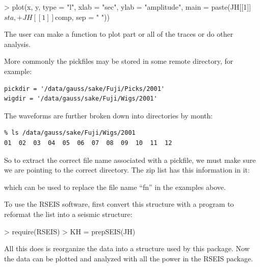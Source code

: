 \documentclass{article}
\begin{document}
\begin{Schunk}
\begin{Sinput}
> plot(x, y, type = "l", xlab = "sec", ylab = "amplitude", main = paste(JH[[1]]$sta, 
+     JH[[1]]$comp, sep = " "))
\end{Sinput}
\end{Schunk}

The user can make a function to plot part or all of the traces or
do other analysis.

More commonly the pickfiles may be stored
in some remote directory, for example:

\begin{verbatim}
pickdir = '/data/gauss/sake/Fuji/Picks/2001'
wigdir = '/data/gauss/sake/Fuji/Wigs/2001'
\end{verbatim}
The waveforms are further broken down into 
directories by month:
\begin{verbatim}
% ls /data/gauss/sake/Fuji/Wigs/2001
01  02  03  04  05  06  07  08  09  10  11  12
\end{verbatim}
So to extract the correct file name associated with a pickfile,
we must make sure we are pointing to the correct directory.
The zip list has this information in it:
\begin{Schunk}
\end{Schunk}
which can be used to replace the file name ``fn'' in the examples above.

To use the RSEIS software, first convert this structure with a
program to reformat the list into a seismic structure:

\begin{Schunk}
\begin{Sinput}
> require(RSEIS)
> KH = prepSEIS(JH)
\end{Sinput}
\end{Schunk}

All this does is reorganize the data into
a structure used by this package.
Now the data can be plotted and 
analyzed with all the power in the RSEIS package.
\end{document}
